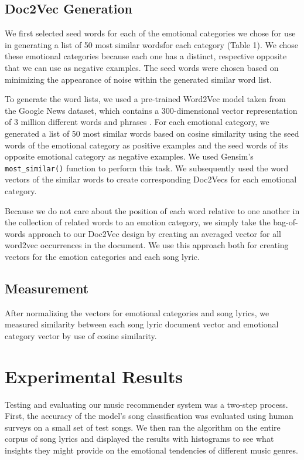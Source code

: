 \documentclass[10pt,twocolumn]{article}
\begin{document}
\subsection{Doc2Vec Generation}

We first selected seed words for each of the emotional categories we chose for use in generating a list of 50 most similar wordsfor each category (Table 1).  We chose these emotional categories because each one has a distinct, respective opposite that we can use as negative examples.  The seed words were chosen based on minimizing the appearance of noise within the generated similar word list.

To generate the word lists, we used a pre-trained Word2Vec model taken from the Google News dataset, which contains a 300-dimensional vector representation of 3 million different words and phrases \cite{a6}.  For each emotional category, we generated a list of 50 most similar words based on cosine similarity using the seed words of the emotional category as positive examples and the seed words of its opposite emotional category as negative examples.  We used Gensim's \texttt{most\_similar()} function to perform this task.  We subsequently used the word vectors of the similar words to create corresponding Doc2Vecs for each emotional category.

Because we do not care about the position of each word relative to one another in the collection of related words to an emotion category, we simply take the bag-of-words approach to our Doc2Vec design by creating an averaged vector for all word2vec occurrences in the document.  We use this approach both for creating vectors for the emotion categories and each song lyric.

\subsection{Measurement}

After normalizing the vectors for emotional categories and song lyrics, we measured similarity between each song lyric document vector and emotional category vector by use of cosine similarity.

\section{Experimental Results}
Testing and evaluating our music recommender system was a two-step process. First, the accuracy of the model's song classification was evaluated using human surveys on a small set of test songs. We then ran the algorithm on the entire corpus of song lyrics and displayed the results with histograms to see what insights they might provide on the emotional tendencies of different music genres.
\end{document}

